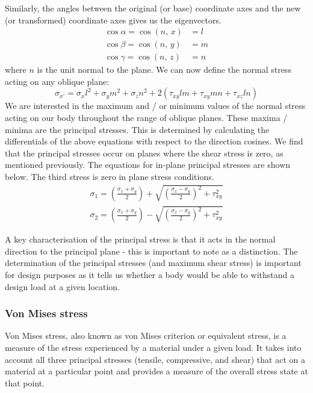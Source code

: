 Similarly, the angles between the original (or base) coordinate axes and the new (or transformed) coordinate axes gives us the eigenvectors. 
\begin{align}
    \cos \alpha = \cos\left(n, \, x\right) & = l\\
    \cos \beta = \cos\left(n, \, y\right) & = m\\
    \cos \gamma = \cos\left(n, \, z\right) & = n
\end{align}
where $n$ is the unit normal to the plane. We can now define the normal stress acting on any oblique plane:
\begin{equation}
    \sigma_{x'} = \sigma_xl^2 + \sigma_y m^2 +\sigma_zn^2 + 2\left(\tau_{xy}lm + \tau_{xy}mn + \tau_{xz}ln\right)
\end{equation}
We are interested in the maximum and / or minimum values of the normal stress acting on our body throughout the range of oblique planes. These maxima / minima are the principal stresses. This is determined by calculating the differentials of the above equations with respect to the direction cosines. We find that the principal stresses occur on planes where the shear stress is zero, as mentioned previously. The equations for in-plane principal stresses are shown below. The third stress is zero in plane stress conditions.
\begin{gather}
    \sigma_1 = \left(\frac{\sigma_x + \sigma_y}{2}\right)+ \sqrt{\left(\frac{\sigma_x - \sigma_y}{2} \right)^2+ \tau^2_{xy} }\\
    \sigma_2 = \left(\frac{\sigma_x + \sigma_y}{2}\right)- \sqrt{\left(\frac{\sigma_x - \sigma_y}{2} \right)^2+ \tau^2_{xy} }
\end{gather}

A key characterisation of the principal stress is that it acts in the normal direction to the principal plane - this is important to note as a distinction. The determination of the principal stresses (and maximum shear stress) is important for design purposes as it tells us whether a body would be able to withstand a design load at a given location.
\subsubsection{Von Mises stress}
Von Mises stress, also known as von Mises criterion or equivalent stress, is a measure of the stress experienced by a material under a given load. It takes into account all three principal stresses (tensile, compressive, and shear) that act on a material at a particular point and provides a measure of the overall stress state at that point. 

